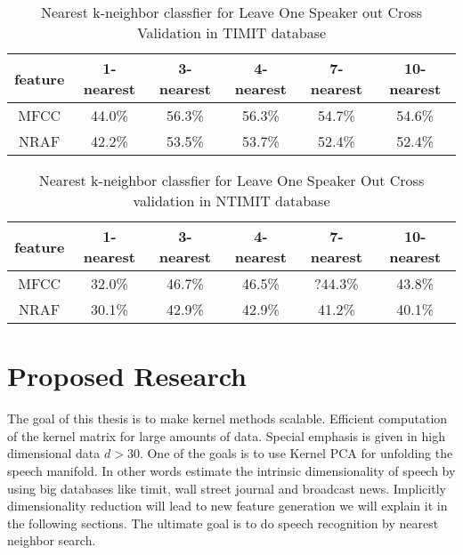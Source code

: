 \documentclass[12pt,letterpaper,doublespaced,ETD,dvips,proposal]{gtthesis}
\begin{document}
\begin{Body}
\begin{table}[htb]
\footnotesize{ \centering
\begin{tabular}{|c|c|c|c|c|c|}
  \hline
  feature & 1-nearest & 3-nearest & 4-nearest & 7-nearest & 10-nearest \\
  \hline
  MFCC & 44.0\% & 56.3\% & 56.3\% & 54.7\% & 54.6\% \\
  NRAF & 42.2\% & 53.5\% & 53.7\% & 52.4\% & 52.4\% \\
  \hline
\end{tabular}
\caption{Nearest k-neighbor classfier for
  Leave One Speaker out Cross Validation in TIMIT database}
} \label{kneighborLOOCVTIMIT}
\end{table}

\begin{table}[htb]
\footnotesize{ \centering
\begin{tabular}{|c|c|c|c|c|c|}
  \hline
  feature & 1-nearest & 3-nearest & 4-nearest & 7-nearest & 10-nearest \\
  \hline
  MFCC & 32.0\% & 46.7\% & 46.5\% & ?44.3\% & 43.8\% \\
  NRAF & 30.1\% & 42.9\% & 42.9\% & 41.2\% & 40.1\% \\
  \hline
\end{tabular}
  \caption{Nearest k-neighbor classfier for Leave One Speaker Out
  Cross validation in  NTIMIT database}
} \label{kneighborLOOCVNTIMIT}
\end{table}


\section{Proposed Research}
\label{proposed}

The goal of this thesis is to make kernel methods scalable.
Efficient computation of the kernel matrix for large amounts of
data. Special emphasis is given in high dimensional data $d>30$. One
of the goals is to use Kernel PCA for unfolding the speech manifold.
In other words estimate the intrinsic dimensionality of speech by
using big databases like timit, wall street journal and broadcast
news. Implicitly dimensionality reduction will lead to new feature
generation we will explain it in the following sections. The
ultimate goal is to do speech recognition by nearest neighbor
search.


\end{Body}
\end{document}
